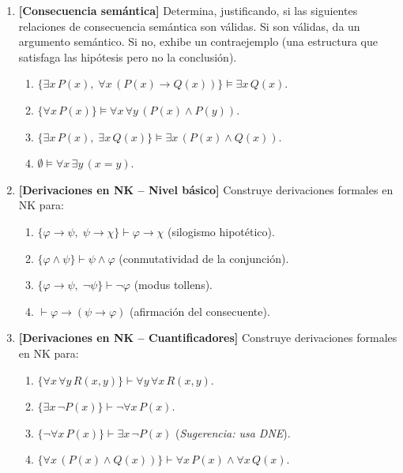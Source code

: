 \begin{enumerate}[leftmargin=2em, label=\textbf{Problema \arabic*.}, itemsep=1em]
  \item \textbf{[Consecuencia semántica]}
  Determina, justificando, si las siguientes relaciones de consecuencia semántica son válidas. Si son válidas, da un argumento semántico. Si no, exhibe un contraejemplo (una estructura que satisfaga las hipótesis pero no la conclusión).
  \begin{enumerate}[label=(\alph*)]
    \item $\{\exists x\, P(x),\; \forall x\,(P(x) \to Q(x))\} \models \exists x\, Q(x)$.
    \item $\{\forall x\, P(x)\} \models \forall x\, \forall y\, (P(x) \wedge P(y))$.
    \item $\{\exists x\, P(x),\; \exists x\, Q(x)\} \models \exists x\,(P(x) \wedge Q(x))$.
    \item $\emptyset \models \forall x\, \exists y\, (x = y)$.
  \end{enumerate}

  \item \textbf{[Derivaciones en NK -- Nivel básico]}
  Construye derivaciones formales en NK para:
  \begin{enumerate}[label=(\alph*)]
    \item $\{\varphi \to \psi,\; \psi \to \chi\} \vdash \varphi \to \chi$ \hfill (silogismo hipotético).
    \item $\{\varphi \wedge \psi\} \vdash \psi \wedge \varphi$ \hfill (conmutatividad de la conjunción).
    \item $\{\varphi \to \psi,\; \neg\psi\} \vdash \neg\varphi$ \hfill (modus tollens).
    \item $\vdash \varphi \to (\psi \to \varphi)$ \hfill (afirmación del consecuente).
  \end{enumerate}

  \item \textbf{[Derivaciones en NK -- Cuantificadores]}
  Construye derivaciones formales en NK para:
  \begin{enumerate}[label=(\alph*)]
    \item $\{\forall x\, \forall y\, R(x,y)\} \vdash \forall y\, \forall x\, R(x,y)$.
    \item $\{\exists x\, \neg P(x)\} \vdash \neg \forall x\, P(x)$.
    \item $\{\neg \forall x\, P(x)\} \vdash \exists x\, \neg P(x)$ \hfill (\textit{Sugerencia: usa DNE}).
    \item $\{\forall x\,(P(x) \wedge Q(x))\} \vdash \forall x\, P(x) \wedge \forall x\, Q(x)$.
  \end{enumerate}


\end{enumerate}
